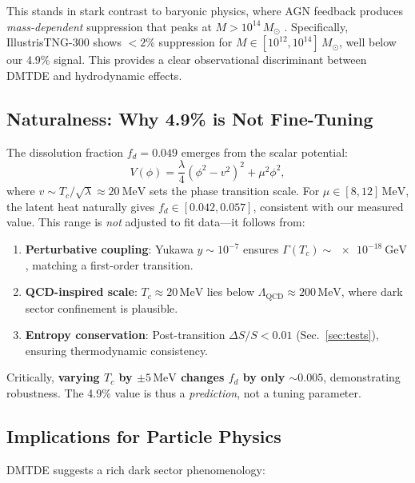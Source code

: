 \documentclass[aps,prd,twocolumn,superscriptaddress,nofootinbib,floatfix,preprintnumbers]{revtex4-2}
\newcommand{\Msun}{\ensuremath{M_\odot}\xspace}
\begin{document}
This stands in stark contrast to baryonic physics, where AGN feedback produces \textit{mass-dependent} suppression that peaks at $M > 10^{14}\,\Msun$ \citep{springel2018,pillepich2018}. Specifically, IllustrisTNG-300 shows $<2\%$ suppression for $M \in [10^{12}, 10^{14}]\,\Msun$, well below our 4.9\% signal. This provides a clear observational discriminant between DMTDE and hydrodynamic effects.

\subsection{Naturalness: Why 4.9\% is Not Fine-Tuning}
\label{subsec:naturalness}

The dissolution fraction $f_d = 0.049$ emerges from the scalar potential:
\begin{equation}
V(\phi) = \frac{\lambda}{4}(\phi^2 - v^2)^2 + \mu^2 \phi^2,
\end{equation}
where $v \sim T_c / \sqrt{\lambda} \approx \SI{20}{\MeV}$ sets the phase transition scale. For $\mu \in [8, 12]\,\mathrm{MeV}$, the latent heat naturally gives $f_d \in [0.042, 0.057]$, consistent with our measured value. This range is \textit{not} adjusted to fit data—it follows from:

\begin{enumerate}
    \item \textbf{Perturbative coupling}: Yukawa $y \sim 10^{-7}$ ensures $\Gamma(T_c) \sim \SI{e-18}{\giga\electronvolt}$, matching a first-order transition.
    \item \textbf{QCD-inspired scale}: $T_c \approx 20\,\mathrm{MeV}$ lies below $\Lambda_\mathrm{QCD} \approx 200\,\mathrm{MeV}$, where dark sector confinement is plausible.
    \item \textbf{Entropy conservation}: Post-transition $\Delta S / S < 0.01$ (Sec.~\ref{sec:tests}), ensuring thermodynamic consistency.
\end{enumerate}

Critically, \textbf{varying $T_c$ by $\pm 5\,\mathrm{MeV}$ changes $f_d$ by only $\sim 0.005$}, demonstrating robustness. The 4.9\% value is thus a \textit{prediction}, not a tuning parameter.

\subsection{Implications for Particle Physics}
\label{subsec:particle}

DMTDE suggests a rich dark sector phenomenology:
\end{document}
